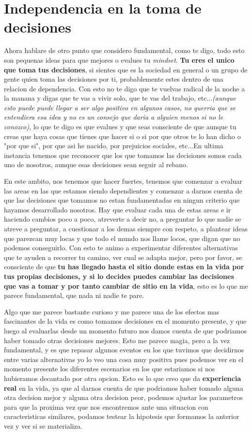 \section{Independencia en la toma de decisiones}
Ahora hablare de otro punto que considero fundamental, como te digo, todo esto son pequenas ideas para que mejores o evalues tu \textit{mindset}. \textbf{Tu eres el unico que toma tus decisiones}, si sientes que es la sociedad en general o un grupo de gente quien toma las decisiones por ti, probablemente estes dentro de una relacion de dependencia. Con esto no te digo que te vuelvas radical de la noche a la manana y digas que te vas a vivir solo, que te vas del trabajo, etc...\textit{(aunque esto puede puede llegar a ser algo positivo en algunos casos, no querria que se entendiera esa idea y no es un consejo que daria a alguien menos si no le conozco)}, lo que te digo es que evalues y que seas consciente de que aunque tu creas que haya cosas que tienes que hacer si o si por que otros te lo han dicho o "por que si", por que asi he nacido, por prejuicios sociales, etc...En ultima instancia tenemos que reconocer que los que tomamos las decisiones somos cada uno de nosotros, aunque esas decisiones sean seguir al rebano. 

En este ambito, nos tenemos que hacer fuertes, tenemos que comenzar a evaluar las areas en las que estamos siendo dependientes y comenzar a darnos cuenta de que las decisiones que tomamos no estan fundamentadas en ningun criterio que hayamos desarrollado nosotros. Hay que evaluar cada una de estas areas e ir haciendo cambios poco a poco, atreverte a decir no, a preguntar lo que nadie se atreve a preguntar, a cuestionar a los demas siempre con respeto, a plantear ideas que parezcan muy locas y que todo el mundo nos llame locos, que digan que no podemos conseguirlo. Con esto te animo a experimentar diferentes alternativas que te ayuden a recorrer tu camino, ver cual se adapta mejor, pero por favor, se consciente de que \textbf{tu has llegado hasta el sitio donde estas en la vida por tus propias decisiones, y si lo decides puedes cambiar las decisiones que vas a tomar y por tanto cambiar de sitio en la vida}, esto es lo que me parece fundamental, que nada ni nadie te pare.

Algo que me parece bastante curioso y me parece una de los efectos mas fascinantes de la vida es como tomamos decisiones en el momento presente, y que luego al evaluarlas desde un momento futuro nos damos cuenta de que podriamos haber tomado otras decisiones mejores. Esto me parece magia, pero a la vez fundamental, y es que repasar algunos eventos en los que tuvimos que decidirnos entre varias alternativas yo lo veo una cosa muy positiva pues podemos ver en el momento presente los diferentes escenarios en los que estariamos si nos hubieramos decantado por otra opcion. Esto es lo que creo que da \textbf{experiencia real} en la vida, ya que al darnos cuenta de que podriamos haber tomado alguna otra decision mejor y alguna otra decision peor, podemos ajustar los parametros para que la proxima vez que nos encontremos ante una situacion con caracteristicas similares, podamos testear la hipotesis que formamos la anterior vez y ver si se materializa.

